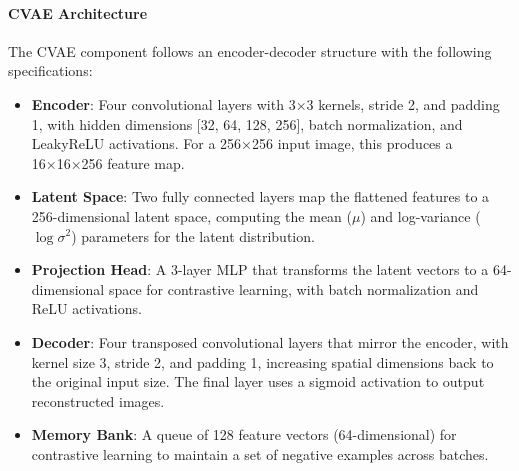 \documentclass[conference]{IEEEtran}
\begin{document}
\paragraph{CVAE Architecture}
The CVAE component follows an encoder-decoder structure with the following specifications:
\begin{itemize}
    \item \textbf{Encoder}: Four convolutional layers with 3×3 kernels, stride 2, and padding 1, with hidden dimensions [32, 64, 128, 256], batch normalization, and LeakyReLU activations. For a 256×256 input image, this produces a 16×16×256 feature map.
    \item \textbf{Latent Space}: Two fully connected layers map the flattened features to a 256-dimensional latent space, computing the mean ($\mu$) and log-variance ($\log\sigma^2$) parameters for the latent distribution.
    \item \textbf{Projection Head}: A 3-layer MLP that transforms the latent vectors to a 64-dimensional space for contrastive learning, with batch normalization and ReLU activations.
    \item \textbf{Decoder}: Four transposed convolutional layers that mirror the encoder, with kernel size 3, stride 2, and padding 1, increasing spatial dimensions back to the original input size. The final layer uses a sigmoid activation to output reconstructed images.
    \item \textbf{Memory Bank}: A queue of 128 feature vectors (64-dimensional) for contrastive learning to maintain a set of negative examples across batches.
\end{itemize}
\end{document}
